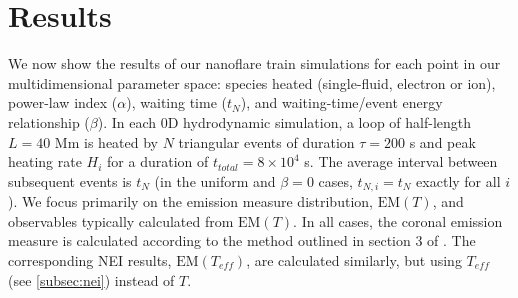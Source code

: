 \documentclass[preprint]{aastex}
\begin{document}
	\section{Results}
	\label{sec:results}
	\par We now show the results of our nanoflare train simulations for each point in our multidimensional parameter space: species heated (single-fluid, electron or ion), power-law index ($\alpha$), waiting time ($t_N$), and waiting-time/event energy relationship ($\beta$). In each 0D hydrodynamic simulation, a loop of half-length $L=40$ Mm is heated by $N$ triangular events of duration $\tau=200$ s and peak heating rate $H_i$ for a duration of $t_{total}=8\times10^4$ s. The average interval between subsequent events is $t_N$ (in the uniform and $\beta=0$ cases, $t_{N,i}=t_N$ exactly for all $i$). We focus primarily on the emission measure distribution, $\mathrm{EM}(T)$, and observables typically calculated from $\mathrm{EM}(T)$. In all cases, the coronal emission measure is calculated according to the method outlined in section 3 of . The corresponding NEI results, $\mathrm{EM}(T_{eff})$, are calculated similarly, but using $T_{eff}$ (see \autoref{subsec:nei}) instead of $T$.
\end{document}
